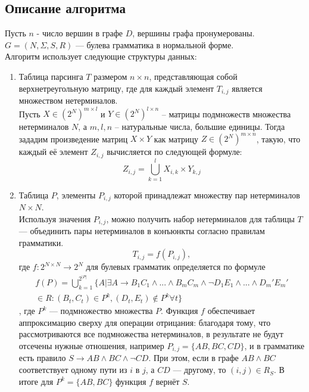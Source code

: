 \documentclass{spbau-diploma}
\begin{document}
\subsection {Описание алгоритма} 
Пусть $n$ - число вершин в графе $D$, вершины графа пронумерованы. $G = (N, \Sigma, S, R)$ --- булева грамматика в нормальной форме.
\\Алгоритм использует следующие структуры данных:
\begin{enumerate}
\item Таблица парсинга $T$ размером $n \times n$, представляющая собой верхнетреугольную матрицу, где для каждый элемент $T_{i, j}$ является множеством нетерминалов. 
\\Пусть $X \in {(2^N)}^{m \times l}$ и $Y \in {(2^N)}^{l \times n}$ – матрицы подмножеств множества нетерминалов $N$, а $m, l, n$ – натуральные числа, большие единицы. Тогда зададим произведение матриц $X \times Y$ как матрицу $Z \in {(2^N)}^{m \times n}$, такую, что каждый её элемент $Z_{i, j}$ вычисляется по следующей формуле:
\begin{equation}\label{eq:mult}
Z_{i,j} = \bigcup_{k=1}^{l}X_{i,k} \times Y_{k, j}
\end{equation}
\item Таблица $P$, элементы $P_{i,j}$ которой принадлежат множеству пар нетерминалов $N \times N$.
\\Используя значения $P_{i,j}$, можно получить набор нетерминалов для таблицы $T$ --- объединить пары нетерминалов в конъюнкты согласно правилам грамматики.
\begin{equation}
T_{i,j} = f(P_{i,j}),
\end{equation}
где $f: 2^{N \times N} \to 2^N$ для булевых грамматик определяется по формуле
  \begin{equation*}
  \begin{aligned}
f(P) = \bigcup_{k=1}^{2^{|P|}} \{A| \exists A \to B_1C_1 \wedge ... \wedge B_mC_m \wedge \neg D_1E_1 \wedge ... \wedge D_m'E_m' \\ 
\in R: (B_t, C_t) \in P^k, (D_t, E_t) \not\in P^k \forall t\}
\end{aligned}
\end{equation*},
где $P^k$ --- подмножество множества $P$. Функция $f$ обеспечивает аппроксимацию сверху для операции отрицания: благодаря тому, что рассмотриваются все подмножества нетерминалов, в результате не будут отсечены нужные отношения, например $P_{i,j} = \{AB, BC, CD\}$, и в грамматике есть правило $S \to AB \wedge BC \wedge \neg CD$. При этом, если в графе $AB \wedge BC$ соответствует одному пути из $i$ в $j$, а $CD$ --- другому, то $(i,j) \in R_S$. В итоге для $P^k = \{AB, BC\}$ функция $f$ вернёт $S$.
\end{enumerate}
\end{document}
